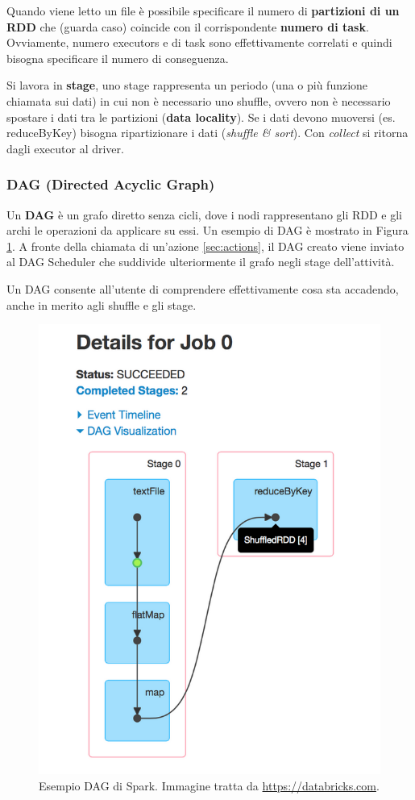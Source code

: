 \documentclass[12pt,italian]{article}
\begin{document}
Quando viene letto un file è possibile specificare il numero di \textbf{partizioni di un RDD} che (guarda caso) coincide con il corrispondente \textbf{numero di task}.
Ovviamente, numero executors e di task sono effettivamente correlati e quindi bisogna specificare il numero di conseguenza.

Si lavora in \textbf{stage}, uno stage rappresenta un periodo (una o più funzione chiamata sui dati) in cui non è necessario uno shuffle, ovvero non è necessario spostare i dati tra le partizioni (\textbf{data locality}). Se i dati devono muoversi (es. reduceByKey) bisogna ripartizionare i dati (\textit{shuffle \& sort}).
Con \textit{collect} si ritorna dagli executor al driver.

\subsubsection{DAG (Directed Acyclic Graph) }\label{sec:DAG}
Un \textbf{DAG} è un grafo diretto senza cicli, dove i nodi rappresentano gli RDD e gli archi le operazioni da applicare su essi. Un esempio di DAG è mostrato in Figura \ref{fig:DAG}.
A fronte della chiamata di un'azione \ref{sec:actions}, il DAG creato viene inviato al DAG Scheduler che suddivide ulteriormente il grafo negli stage dell'attività.
\par Un DAG consente all'utente di comprendere effettivamente cosa sta accadendo, anche in merito agli shuffle e gli stage.
\begin{figure}[H]
	\centering 
	\includegraphics[width=0.6\linewidth]{img/DAG.png}
	\caption{Esempio DAG di Spark. Immagine tratta da \url{https://databricks.com}.}
	\label{fig:DAG}
\end{figure}
\end{document}
